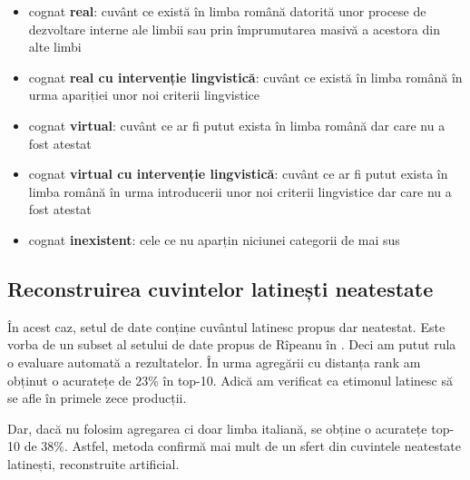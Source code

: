 \begin{itemize}
  \item cognat \textbf{real}: cuvânt ce există în limba română datorită unor procese de dezvoltare
    interne ale limbii sau prin împrumutarea masivă a acestora din alte limbi
  \item cognat \textbf{real cu intervenție lingvistică}: cuvânt ce există în limba română în urma
    apariției unor noi criterii lingvistice
  \item cognat \textbf{virtual}: cuvânt ce ar fi putut exista în limba română dar care nu a fost
    atestat
  \item cognat \textbf{virtual cu intervenție lingvistică}: cuvânt ce ar fi putut exista în limba
    română în urma introducerii unor noi criterii lingvistice dar care nu a fost atestat
  \item cognat \textbf{inexistent}: cele ce nu aparțin niciunei categorii de mai sus
\end{itemize}

\subsection{Reconstruirea cuvintelor latinești neatestate}
În acest caz, setul de date conține cuvântul latinesc propus dar neatestat. Este vorba de un subset
al setului de date propus de Rîpeanu în \cite{ripeanubook}. Deci am putut rula o evaluare automată
a rezultatelor. În urma agregării cu distanța rank am obținut o acuratețe de $23\%$ în top-10. 
Adică am verificat ca etimonul latinesc să se afle în primele zece producții.

Dar, dacă nu folosim agregarea ci doar limba italiană, se obține o acuratețe top-10 de $38\%$.
Astfel, metoda confirmă mai mult de un sfert din cuvintele neatestate latinești, reconstruite artificial.
